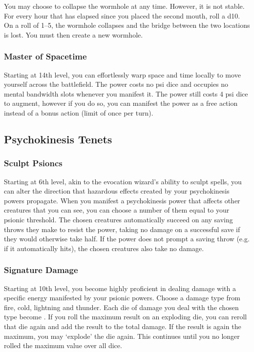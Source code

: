 You may choose to collapse the wormhole at any time.
However, it is not stable.
For every hour that has elapsed since you placed the second mouth,
roll a d10.
On a roll of 1--5,
the wormhole collapses and the bridge between the two locations
is lost.
You must then create a new wormhole.

\subsubsection{Master of Spacetime}
Starting at 14th level,
you can effortlessly warp space and time locally to
move yourself across the battlefield.
The  power costs no psi dice
and occupies no mental bandwidth slots
whenever you manifest it.
The power still costs 4 psi dice to augment,
however if you do so,
you can manifest the power as a free action
instead of a bonus action
(limit of once per turn).

\subsection{Psychokinesis Tenets}
\subsubsection{Sculpt Psioncs}
Starting at 6th level,
akin to the evocation wizard's ability to sculpt spells,
you can alter the direction that hazardous effects
created by your psychokinesis powers propagate.
When you manifest a psychokinesis power that affects
other creatures that you can see,
you can choose a number of them equal to your
psionic threshold.
The chosen creatures automatically succeed on any saving
throws they make to resist the power,
taking no damage on a successful save if they would
otherwise take half.
If the power does not prompt a saving throw
(e.g. if it automatically hits),
the chosen creatures also take no damage.

\subsubsection{Signature Damage}
Starting at 10th level,
you become highly proficient in dealing damage
with a specific energy manifested by your psionic powers.
Choose a damage type from fire, cold, lightning and thunder.
Each die of damage you deal with the chosen type
become .
If you roll the maximum result on an exploding die,
you can reroll that die again and add the result to the
total damage.
If the result is again the maximum,
you may `explode' the die again.
This continues until you no
longer rolled the maximum value over all dice.

